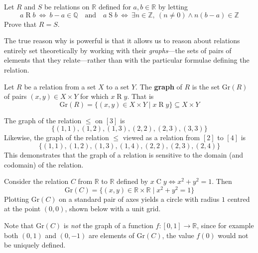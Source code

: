 \begin{exercise}
Let $R$ and $S$ be relations on $\mathbb{R}$ defined for $a,b \in \mathbb{R}$ by letting
\[ a \mathrel{R} b ~ \Leftrightarrow ~ b-a \in \mathbb{Q} \quad \text{and} \quad a \mathrel{S} b ~ \Leftrightarrow ~ \exists n \in \mathbb{Z},~ (n \ne 0) \wedge n(b-a) \in \mathbb{Z} \]
Prove that $R=S$.
\end{exercise}

The true reason why  is powerful is that it allows us to reason about relations entirely set theoretically by working with their \textit{graphs}---the sets of pairs of elements that they relate---rather than with the particular formulae defining the relation.

\begin{definition}
\label{defRelationGraph}
Let $R$ be a relation from a set $X$ to a set $Y$. The \textbf{graph} of $R$ is the set $\mathrm{Gr}(R)$  of pairs $(x,y) \in X \times Y$ for which $x \mathrel{R} y$. That is
\[ \mathrm{Gr}(R) = \{ (x,y) \in X \times Y \mid x \mathrel{R} y \} \subseteq X \times Y \]
\end{definition}

\begin{example}
The graph of the relation $\le$ on $[3]$ is
\[ \{ (1,1), (1,2), (1,3), (2,2), (2,3), (3,3) \} \]
Likewise, the graph of the relation $\le$ viewed as a relation from $[2]$ to $[4]$ is
\[ \{ (1,1), (1,2), (1,3), (1,4), (2,2), (2,3), (2,4) \} \]
This demonstrates that the graph of a relation is sensitive to the domain (and codomain) of the relation.
\end{example}

\begin{example}
\label{exCircleRelation}
Consider the relation $C$ from $\mathbb{R}$ to $\mathbb{R}$ defined by $x \mathrel{C} y \Leftrightarrow x^2+y^2=1$. Then
\[ \mathrm{Gr}(C) = \{ (x,y) \in \mathbb{R} \times \mathbb{R} \mid x^2+y^2=1 \} \]
Plotting $\mathrm{Gr}(C)$ on a standard pair of axes yields a circle with radius $1$ centred at the point $(0,0)$, shown below with a unit grid.
\begin{center}
\end{center}
Note that $\mathrm{Gr}(C)$ is \textit{not} the graph of a function $f : [0,1] \to \mathbb{R}$, since for example both $(0,1)$ and $(0,{-1})$ are elements of $\mathrm{Gr}(C)$, the value $f(0)$ would not be uniquely defined.
\end{example}


